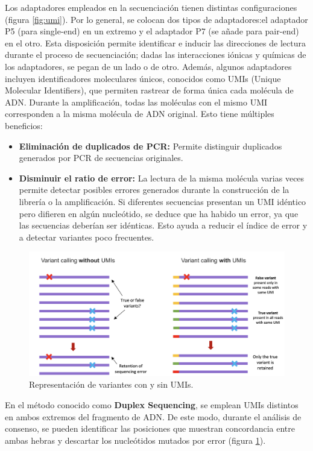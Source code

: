 Los adaptadores empleados en la secuenciación tienen distintas configuraciones (figura \ref{fig:umi}). Por lo general, se colocan dos tipos de adaptadores:el adaptador P5 (para single-end) en un extremo y el adaptador P7 (se añade para pair-end) en el otro. Esta disposición permite identificar e inducir las direcciones de lectura durante el proceso de secuenciación; dadas las interacciones iónicas y químicas de los adaptadores, se pegan de un lado o de otro. 
Además, algunos adaptadores incluyen identificadores moleculares únicos, conocidos como UMIs (Unique Molecular Identifiers), que permiten rastrear de forma única cada molécula de ADN. Durante la amplificación, todas las moléculas con el mismo UMI corresponden a la misma molécula de ADN original. Esto tiene múltiples beneficios:
\begin{itemize}
\item \textbf{Eliminación de duplicados de PCR:} Permite distinguir duplicados generados por PCR de secuencias originales.
\item \textbf{Disminuir el ratio de error:} La lectura de la misma molécula varias veces permite detectar posibles errores generados durante la construcción de la librería o la amplificación. Si diferentes secuencias presentan un UMI idéntico pero difieren en algún nucleótido, se deduce que ha habido un error, ya que las secuencias deberían ser idénticas. Esto ayuda a reducir el índice de error y a detectar variantes poco frecuentes.
\end{itemize}

\begin{figure}[htbp]
\centering
\includegraphics[width = \textwidth]{figs/umi-variants.png}
\caption{Representación de variantes con y sin UMIs.}
\label{fig:umi-variantes}
\end{figure}

En el método conocido como \textbf{Duplex Sequencing}, se emplean UMIs distintos en ambos extremos del fragmento de ADN. De este modo, durante el análisis de consenso, se pueden identificar las posiciones que muestran concordancia entre ambas hebras y descartar los nucleótidos mutados por error (figura \ref{fig:umi-variantes}).

